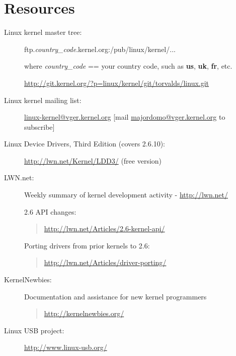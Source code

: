 \documentclass[a4paper,8pt,english]{sphinxmanual}
\begin{document}
\section{Resources}
\label{process/submitting-drivers:resources}\begin{description}
\item[{Linux kernel master tree:}] \leavevmode
ftp.\emph{country\_code}.kernel.org:/pub/linux/kernel/...

where \emph{country\_code} == your country code, such as
\textbf{us}, \textbf{uk}, \textbf{fr}, etc.

\href{http://git.kernel.org/?p=linux/kernel/git/torvalds/linux.git}{http://git.kernel.org/?p=linux/kernel/git/torvalds/linux.git}

\item[{Linux kernel mailing list:}] \leavevmode
\href{mailto:linux-kernel@vger.kernel.org}{linux-kernel@vger.kernel.org}
{[}mail \href{mailto:majordomo@vger.kernel.org}{majordomo@vger.kernel.org} to subscribe{]}

\item[{Linux Device Drivers, Third Edition (covers 2.6.10):}] \leavevmode
\href{http://lwn.net/Kernel/LDD3/}{http://lwn.net/Kernel/LDD3/}  (free version)

\item[{LWN.net:}] \leavevmode
Weekly summary of kernel development activity - \href{http://lwn.net/}{http://lwn.net/}

2.6 API changes:
\begin{quote}

\href{http://lwn.net/Articles/2.6-kernel-api/}{http://lwn.net/Articles/2.6-kernel-api/}
\end{quote}

Porting drivers from prior kernels to 2.6:
\begin{quote}

\href{http://lwn.net/Articles/driver-porting/}{http://lwn.net/Articles/driver-porting/}
\end{quote}

\item[{KernelNewbies:}] \leavevmode
Documentation and assistance for new kernel programmers
\begin{quote}

\href{http://kernelnewbies.org/}{http://kernelnewbies.org/}
\end{quote}

\item[{Linux USB project:}] \leavevmode
\href{http://www.linux-usb.org/}{http://www.linux-usb.org/}


\end{description}
\end{document}
